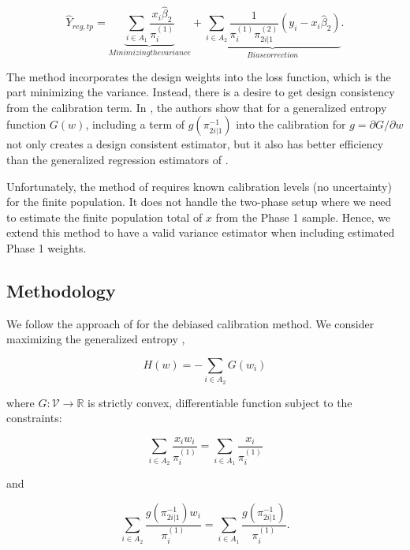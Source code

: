 \documentclass[12pt]{article}
\newcommand{\R}{\mathbb{R}}
\begin{document}
$$ \hat Y_{reg, tp} 
= \underbrace{\sum_{i \in A_1} \frac{x_i \hat \beta_2}{\pi_i^{(1)}}}_{Minimizing
the variance} + \underbrace{\sum_{i \in A_2}
\frac{1}{\pi_i^{(1)}\pi_{2i|1}^{(2)}} (y_i - x_i \hat \beta_2)}_{Bias
correction}.$$

The \cite{deville1992calibration} method incorporates the design weights into
the loss function, which is the part minimizing the variance. Instead, there is
a desire to get design consistency from the calibration term. In 
\cite{kwon2024debiased}, the authors show that for a generalized entropy
function $G(w)$, including a term of $g(\pi_{2i|1}^{-1})$ into the calibration
for $g = \partial G / \partial w$ not only creates a design consistent
estimator, but it also has better efficiency than the generalized regression
estimators of \cite{deville1992calibration}.

Unfortunately, the method of \cite{kwon2024debiased} requires known calibration
levels (no uncertainty) for the finite population. It does not handle the
two-phase setup where we need to estimate the finite population total of $x$
from the Phase 1 sample. Hence, we extend this method to have a valid variance 
estimator when including estimated Phase 1 weights.

\subsection*{Methodology}

We follow the approach of \cite{kwon2024debiased} for the debiased calibration
method. We consider maximizing the generalized entropy \cite{gneiting2007strictly},

\begin{equation}\label{eq:primalloss}
H(w) = - \sum_{i \in A_2} G(w_i)
\end{equation}

where $G: \mathcal{V} \to \R$ is strictly convex, differentiable function
subject to the constraints:

\begin{equation}\label{eq:calconst1}
\sum_{i \in A_2} \frac{x_i w_i}{\pi_i^{(1)}} = 
\sum_{i \in A_1} \frac{x_i}{\pi_i^{(1)}}
\end{equation}

and 

\begin{equation}\label{eq:calconst2}
\sum_{i \in A_2} \frac{g(\pi_{2i|1}^{-1})w_i}{\pi_i^{(1)}} = 
\sum_{i \in A_1} \frac{g(\pi_{2i|1}^{-1})}{\pi_i^{(1)}}.
\end{equation}
\end{document}
